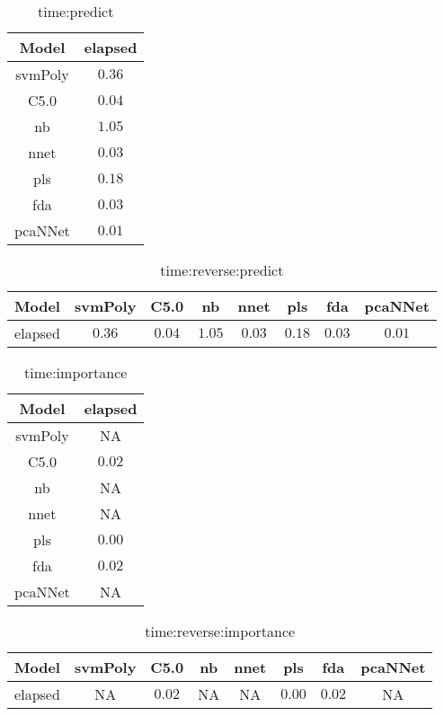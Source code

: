 \begin{table}[!ht]
	\centering
	\begin{tabular}{|c|c|}
		\hline
		Model & elapsed \\ \hline
		svmPoly & $0.36$ \\ \hline
		C5.0 & $0.04$ \\ \hline
		nb & $1.05$ \\ \hline
		nnet & $0.03$ \\ \hline
		pls & $0.18$ \\ \hline
		fda & $0.03$ \\ \hline
		pcaNNet & $0.01$ \\ \hline
	\end{tabular}
	\caption{time:predict}
	\label{tab:time:predict}
\end{table}

\begin{table}[!ht]
	\centering
	\begin{tabular}{|c|c|c|c|c|c|c|c|}
		\hline
		Model & svmPoly & C5.0 & nb & nnet & pls & fda & pcaNNet \\ \hline
		elapsed & $0.36$ & $0.04$ & $1.05$ & $0.03$ & $0.18$ & $0.03$ & $0.01$ \\ \hline
	\end{tabular}
	\caption{time:reverse:predict}
	\label{tab:time:reverse:predict}
\end{table}

\begin{table}[!ht]
	\centering
	\begin{tabular}{|c|c|}
		\hline
		Model & elapsed \\ \hline
		svmPoly & NA \\ \hline
		C5.0 & $0.02$ \\ \hline
		nb & NA \\ \hline
		nnet & NA \\ \hline
		pls & $0.00$ \\ \hline
		fda & $0.02$ \\ \hline
		pcaNNet & NA \\ \hline
	\end{tabular}
	\caption{time:importance}
	\label{tab:time:importance}
\end{table}

\begin{table}[!ht]
	\centering
	\begin{tabular}{|c|c|c|c|c|c|c|c|}
		\hline
		Model & svmPoly & C5.0 & nb & nnet & pls & fda & pcaNNet \\ \hline
		elapsed & NA & $0.02$ & NA & NA & $0.00$ & $0.02$ & NA \\ \hline
	\end{tabular}
	\caption{time:reverse:importance}
	\label{tab:time:reverse:importance}
\end{table}

